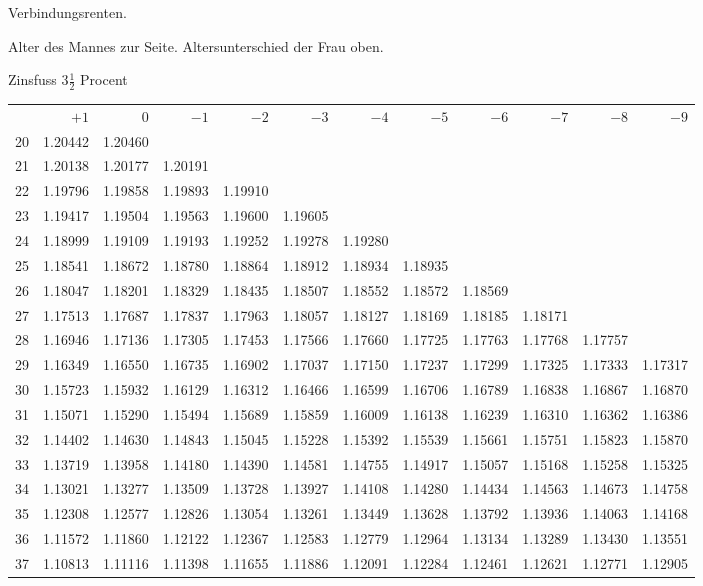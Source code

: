 \clearpage
{}
\begin{center}
Verbindungsrenten.\par\smallskip
Alter des Mannes zur Seite. Altersunterschied der Frau oben.\par\smallskip
Zinsfuss \(3\tfrac{1}{2}\) Procent\par\medskip
\fontsize{8}{10}\selectfont\setlength{\tabcolsep}{1.3pt}
\begin{tabular}{|r|rrrrrrrrrrr|}
\hline
&\(+1\)&0&\(-1\)&\(-2\)&\(-3\)&\(-4\)&\(-5\)&\(-6\)&\(-7\)&\(-8\)&\(-9\)\\[8pt]
20&1.20442&1.20460&&&&&&&&&\\
21&1.20138&1.20177&1.20191&&&&&&&&\\
22&1.19796&1.19858&1.19893&1.19910&&&&&&&\\
23&1.19417&1.19504&1.19563&1.19600&1.19605&&&&&&\\
24&1.18999&1.19109&1.19193&1.19252&1.19278&1.19280&&&&&\\[5pt]
25&1.18541&1.18672&1.18780&1.18864&1.18912&1.18934&1.18935&&&&\\
26&1.18047&1.18201&1.18329&1.18435&1.18507&1.18552&1.18572&1.18569&&&\\
27&1.17513&1.17687&1.17837&1.17963&1.18057&1.18127&1.18169&1.18185&1.18171&&\\
28&1.16946&1.17136&1.17305&1.17453&1.17566&1.17660&1.17725&1.17763&1.17768&1.17757&\\
29&1.16349&1.16550&1.16735&1.16902&1.17037&1.17150&1.17237&1.17299&1.17325&1.17333&1.17317\\[5pt]
30&1.15723&1.15932&1.16129&1.16312&1.16466&1.16599&1.16706&1.16789&1.16838&1.16867&1.16870\\
31&1.15071&1.15290&1.15494&1.15689&1.15859&1.16009&1.16138&1.16239&1.16310&1.16362&1.16386\\
32&1.14402&1.14630&1.14843&1.15045&1.15228&1.15392&1.15539&1.15661&1.15751&1.15823&1.15870\\
33&1.13719&1.13958&1.14180&1.14390&1.14581&1.14755&1.14917&1.15057&1.15168&1.15258&1.15325\\
34&1.13021&1.13277&1.13509&1.13728&1.13927&1.14108&1.14280&1.14434&1.14563&1.14673&1.14758\\[5pt]
35&1.12308&1.12577&1.12826&1.13054&1.13261&1.13449&1.13628&1.13792&1.13936&1.14063&1.14168\\
36&1.11572&1.11860&1.12122&1.12367&1.12583&1.12779&1.12964&1.13134&1.13289&1.13430&1.13551\\
37&1.10813&1.11116&1.11398&1.11655&1.11886&1.12091&1.12284&1.12461&1.12621&1.12771&1.12905\\

\end{tabular}
\end{center}
